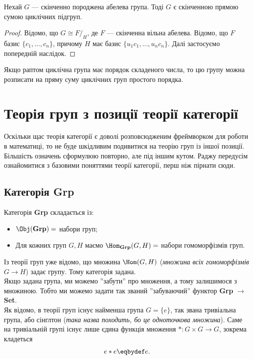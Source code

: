 \documentclass{math_library}
\begin{document}
\begin{theorem}
Нехай $G$ --- скінченно породжена абелева група. Тоді $G$ є скінченною прямою сумою циклічних підгруп.
\end{theorem}

\begin{proof}
Відомо, що $G \cong F/_H$, де $F$ --- скінченна вільна абелева. Відомо, що $F$  базис $\{c_1,\dots,c_n\}$, причому $H$ має базис $\{u_1c_1,\dots,u_nc_n\}$. Далі застосуємо попередній наслідок.
\end{proof}

Якщо раптом циклічна група має порядок складеного числа, то цю групу можна розписати на пряму суму циклічних груп простого порядка.

\newpage

\section{Теорія груп з позиції теорії категорії}
Оскільки щас теорія категорії є доволі розповсюдженим фреймворком для роботи в математиці, то не буде шкідливим подивитися на теорію груп із іншої позиції. Більшість означень сформулюю повторно, але під іншим кутом. Раджу передусім ознайомитися з базовими поняттями теорії категорії, перш ніж пірнати сюди.

\subsection{Категорія \textbf{Grp}}
Категорія \textbf{Grp} складається із:
\begin{itemize}[nosep]
\item $\Obj(\textbf{Grp}) = $ набори груп;
\item Для кожних груп $G,H$ маємо $\Hom_\textbf{Grp}(G,H) = $ набори гомоморфізмів груп.
\end{itemize}
Із теорії груп уже відомо, що множина $\Hom(G,H)$ (\textit{множина всіх гомоморфізмів $G \to H$}) задає групу. Тому категорія задана.
\bigskip \\
Якщо задана група, ми можемо ''забути'' про множення, а тому залишимося з множиною. Тобто ми можемо задати так званий ''забуваючий'' функтор \textbf{Grp} $\to$ \textbf{Set}.
\bigskip \\
Як відомо, в теорії груп існує найменша група $G = \{e\}$, так звана тривіальна група, або сінглтон (\textit{така назва походить, бо це одноточкова множина}). Саме на тривіальній групі існує лише єдина функція множення $* \colon G \times G \to G$, зокрема кладеться
\[
e*e \eqbydef e.
\]
\end{document}
